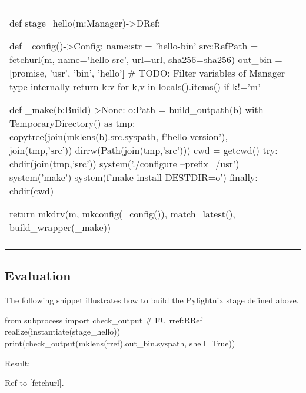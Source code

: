 \documentclass{article}
\begin{document}
\begin{tabular}{|p{}|p{}|}
\begin{pyblock}[stdout][numbers=left]
def stage_hello(m:Manager)->DRef:

  def _config()->Config:
    name:str = 'hello-bin'
    src:RefPath = fetchurl(m, name='hello-src',
                              url=url,
                              sha256=sha256)
    out_bin = [promise, 'usr', 'bin', 'hello']
    # TODO: Filter variables of Manager type internally
    return {k:v for k,v in locals().items() if k!='m'}

  def _make(b:Build)->None:
    o:Path = build_outpath(b)
    with TemporaryDirectory() as tmp:
      copytree(join(mklens(b).src.syspath, f'hello-{version}'), join(tmp,'src'))
      dirrw(Path(join(tmp,'src')))
      cwd = getcwd()
      try:
        chdir(join(tmp,'src'))
        system('./configure --prefix=/usr')
        system('make')
        system(f'make install DESTDIR={o}')
      finally:
        chdir(cwd)

  return mkdrv(m, mkconfig(_config()),
                  match_latest(),
                  build_wrapper(_make))
\end{pyblock}

\normalsize

\\



&


\\

\hline
\end{tabular}

\subsection{Evaluation}

The following snippet illustrates how to build the Pylightnix stage defined
above.

\begin{pyblock}[stdout]
from subprocess import check_output   # FU \label{fetchurl}
rref:RRef = realize(instantiate(stage_hello))
print(check_output(mklens(rref).out_bin.syspath, shell=True))
\end{pyblock}
Result:
\stdoutpythontex

Ref to \ref{fetchurl}.
\end{document}
